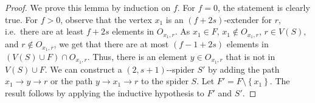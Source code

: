 \documentclass[10pt,a4paper]{amsart}
\providecommand{\nobreakdash}{\nobreak\hbox{-}}
\newcommand{\set}[1]{{\left\{#1\right\}}}
\begin{document}
\begin{proof}
    We prove this lemma by induction on $f$.
    For $f=0$, the statement is clearly true.
    For $f>0$, observe that the vertex $x_1$ is an $(f+2s)$-extender for $r$, i.e.\ there are at least $f+2s$ elements in $O_{x_1,r}$.
    As $x_1 \in F$, $x_1 \notin O_{x_1,r}$, $r \in V(S)$, and $r \notin O_{x_1,r}$, we get that there are at most $(f-1 + 2s)$ elements in $(V(S)\cup F)\cap O_{x_1,r}$.
    Thus, there is an element $y \in O_{x_1,r}$ that is not in $V(S) \cup F$.
    We can construct a $(2,s+1)$\nobreakdash-spider $S'$ by adding the path $x_1 \to y \to r$ or the path $y \to x_1 \to r$ to the spider $S$.
    Let $F'=F\setminus \set{x_1}$.
    The result follows by applying the inductive hypothesis to $F'$ and $S'$.
\end{proof}
\end{document}
